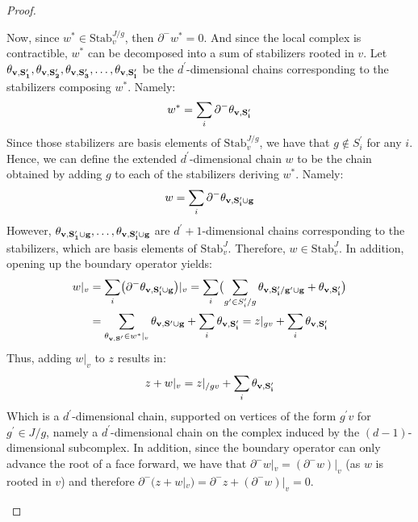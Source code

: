 \begin{proof}
\begin{enumerate}
      
      Now, since $w^{*} \in \text{Stab}_{v}^{J/g}$, then $\partial^{-}w^{*} = 0$. And since the local complex is contractible, $w^{*}$ can be decomposed into a sum of stabilizers rooted in $v$. Let $\mathbf{\theta_{v ,S^{\prime}_{1}} }, \mathbf{\theta_{v ,S^{\prime}_{2}} }, \mathbf{\theta_{v ,S^{\prime}_{3}} }, \ldots, \mathbf{\theta_{v ,S^{\prime}_{l}} }$ be the $d^{\prime}$-dimensional chains corresponding to the stabilizers composing $w^{*}$. Namely:
      \begin{equation*}
        \begin{split}
          w^{*} = \sum_{i} \partial^{-} \mathbf{\theta_{v ,S^{\prime}_{i}} } 
        \end{split}
      \end{equation*}
Since those stabilizers are basis elements of $\text{Stab}_{v}^{J/g}$, we have that $g \notin S^{\prime}_{i}$ for any $i$. Hence, we can define the extended $d^{\prime}$-dimensional chain $w$ to be the chain obtained by adding $g$ to each of the stabilizers deriving $w^{*}$. Namely:
      \begin{equation*}
        \begin{split}
          w =  \sum_{i} \partial^{-} \mathbf{\theta_{v ,S^{\prime}_{i} \cup g} } 
        \end{split}
      \end{equation*}
      However, $\mathbf{\theta_{v ,S^{\prime}_{1} \cup g} }, \ldots, \mathbf{\theta_{v ,S^{\prime}_{l} \cup g} }$ are $d^{\prime}+1$-dimensional chains corresponding to the stabilizers, which are basis elements of $\text{Stab}_{v}^{J}$. Therefore, $w \in \text{Stab}^{J}_{v}$. In addition, opening up the boundary operator yields:
      \begin{equation*}
        \begin{split}
          w|_{v} &=  \sum_{i} \bigl(\partial^{-} \mathbf{\theta_{v ,S^{\prime}_{i} \cup g} } \bigr)|_{v} = \sum_{i} \bigl(\sum_{g^{\prime} \in S^{\prime}_{i}/g}\mathbf{\theta_{v ,S^{\prime}_{i}/g^{\prime} \cup g} } + \mathbf{\theta_{v ,S^{\prime}_{i}} }   \bigr)\\
          &= \sum_{\mathbf{\theta_{v ,S^{\prime}}{} }{}\in w^{*}|_{v} }\mathbf{\theta_{v ,S^{\prime} \cup g} } + \sum_{i} \mathbf{\theta_{v ,S^{\prime}_{i}} } = z|_{gv} + \sum_{i} \mathbf{\theta_{v ,S^{\prime}_{i}} } 
        \end{split}
      \end{equation*}
Thus, adding $w|_{v}$ to $z$ results in:
      \begin{equation*}
        \begin{split}
          z + w|_{v} = z|_{/gv} + \sum_{i} \mathbf{\theta_{v ,S^{\prime}_{i}} } 
        \end{split}
      \end{equation*}
      Which is a $d^{\prime}$-dimensional chain, supported on vertices of the form $g^{\prime}v$ for $g^{\prime}\in J/g$, namely a $d^\prime$-dimensional chain on the complex induced by the $(d-1)$-dimensional subcomplex. In addition, since the boundary operator can only advance the root of a face forward, we have that $\partial^{-} w|_{v} =  (\partial^{-} w)|_{v}$ (as $w$ is rooted in $v$) and therefore $\partial^{-}( z + w|_{v}) = \partial^{-}z + (\partial^{-}w)|_{v} = 0$.
      

\end{enumerate}
\end{proof}
